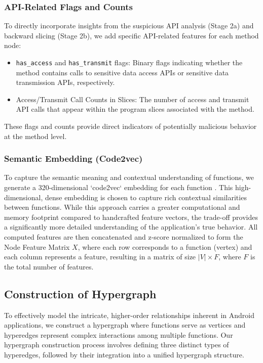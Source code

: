 \documentclass[runningheads]{llncs}
\begin{document}
\subsubsection{API-Related Flags and Counts}
To directly incorporate insights from the suspicious API analysis (Stage 2a) and backward slicing (Stage 2b), we add specific API-related features for each method node:
\begin{itemize}
    \item \texttt{has\_access} and \texttt{has\_transmit} flags: Binary flags indicating whether the method contains calls to sensitive data access APIs or sensitive data transmission APIs, respectively.
    \item Access/Transmit Call Counts in Slices: The number of access and transmit API calls that appear within the program slices associated with the method.
\end{itemize}
These flags and counts provide direct indicators of potentially malicious behavior at the method level.

\subsubsection{Semantic Embedding (Code2vec)}
To capture the semantic meaning and contextual understanding of functions, we generate a 320-dimensional `code2vec` embedding for each function \cite{alon2019code2vec}. This high-dimensional, dense embedding is chosen to capture rich contextual similarities between functions. While this approach carries a greater computational and memory footprint compared to handcrafted feature vectors, the trade-off provides a significantly more detailed understanding of the application's true behavior. All computed features are then concatenated and z-score normalized to form the Node Feature Matrix $X$, where each row corresponds to a function (vertex) and each column represents a feature, resulting in a matrix of size $|V| \times F$, where $F$ is the total number of features.


\subsection{Construction of Hypergraph}
To effectively model the intricate, higher-order relationships inherent in Android applications, we construct a hypergraph where functions serve as vertices and hyperedges represent complex interactions among multiple functions. Our hypergraph construction process involves defining three distinct types of hyperedges, followed by their integration into a unified hypergraph structure.
\end{document}
